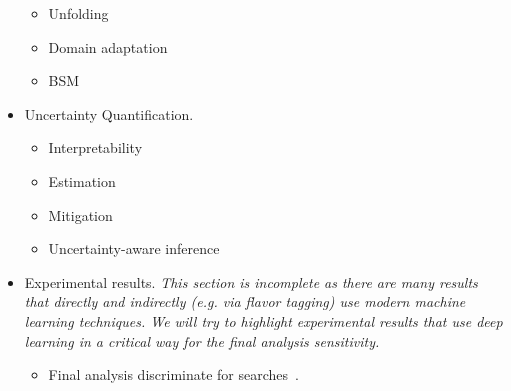 \documentclass[12pt,letterpaper]{article}
\begin{document}
\begin{itemize}
\begin{itemize}
		\item Unfolding~\cite{Andreassen:2019cjw,Datta:2018mwd,Bellagente:2019uyp,Gagunashvili:2010zw,Glazov:2017vni,Martschei:2012pr,Lindemann:1995ut,Zech2003BinningFreeUB,1800956,Vandegar:2020yvw}
		\item Domain adaptation~\cite{Rogozhnikov:2016bdp,Andreassen:2019nnm,Cranmer:2015bka,2009.03796}
		\item BSM~\cite{Andreassen:2020nkr,Hollingsworth:2020kjg,Brehmer:2018kdj,Brehmer:2018eca,Brehmer:2018hga,Brehmer:2019xox,Romao:2020ojy}
	\end{itemize}
\item Uncertainty Quantification.
	\begin{itemize}
		\item Interpretability~\cite{deOliveira:2015xxd,Chang:2017kvc,Diefenbacher:2019ezd,Agarwal:2020fpt}
		\item Estimation~\cite{Nachman:2019dol,Nachman:2019yfl,Barnard:2016qma}
		\item Mitigation~\cite{Estrade:DLPS2017,Englert:2018cfo,Louppe:2016ylz}
		\item Uncertainty-aware inference~\cite{Caron:2019xkx,Bollweg:2019skg,deCastro:2018mgh,Wunsch:2020iuh}
	\end{itemize}
\item Experimental results. \textit{This section is incomplete as there are many results that directly and indirectly (e.g. via flavor tagging) use modern machine learning techniques.  We will try to highlight experimental results that use deep learning in a critical way for the final analysis sensitivity.}
	\begin{itemize}
		\item Final analysis discriminate for searches~\cite{Aad:2019yxi,Aad:2020hzm,collaboration2020dijet,Sirunyan:2020hwz}.
	\end{itemize}


\end{itemize}


\clearpage
\flushbottom
%


\end{document}
